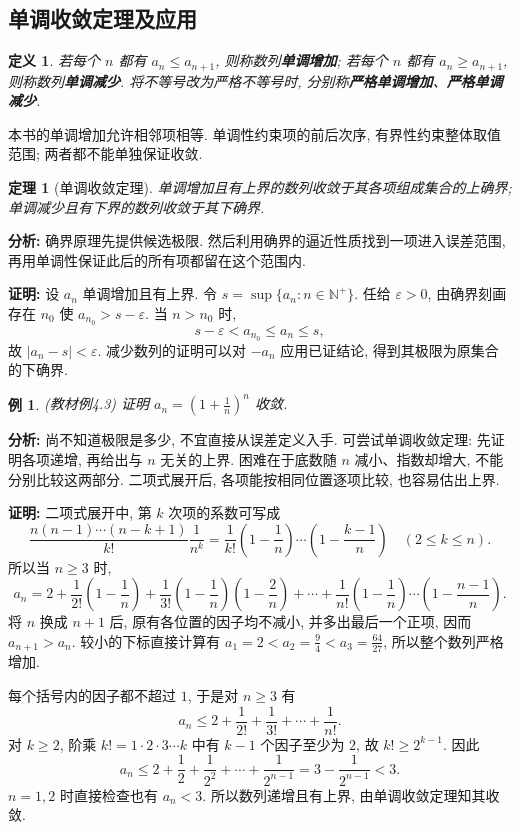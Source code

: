 \documentclass[UTF8,openany]{ctexbook}
\theoremstyle{chinesetextbook}
\newtheorem{definition}{定义}[section]
\newtheorem{example}{例}[section]
\newtheorem{theorem}{定理}[section]
\newenvironment{cnproof}{\par\indent\textbf{证明:} \ignorespaces}{\par}
\begin{document}
\subsection{单调收敛定理及应用}
\begin{definition}
若每个 $n$ 都有 $a_n\le a_{n+1}$, 则称数列\textbf{单调增加}; 若每个 $n$ 都有 $a_n\ge a_{n+1}$, 则称数列\textbf{单调减少}. 将不等号改为严格不等号时, 分别称\textbf{严格单调增加}、\textbf{严格单调减少}.
\end{definition}
本书的单调增加允许相邻项相等. 单调性约束项的前后次序, 有界性约束整体取值范围; 两者都不能单独保证收敛.
\begin{theorem}[单调收敛定理]
单调增加且有上界的数列收敛于其各项组成集合的上确界; 单调减少且有下界的数列收敛于其下确界.
\end{theorem}
\par\indent\textbf{分析:} 确界原理先提供候选极限. 然后利用确界的逼近性质找到一项进入误差范围, 再用单调性保证此后的所有项都留在这个范围内.
\begin{cnproof}
设 $a_n$ 单调增加且有上界. 令 $s=\sup\{a_n:n\in\mathbb N^+\}$. 任给 $\varepsilon>0$, 由确界刻画存在 $n_0$ 使 $a_{n_0}>s-\varepsilon$. 当 $n>n_0$ 时,
\[
s-\varepsilon<a_{n_0}\le a_n\le s,
\]
故 $|a_n-s|<\varepsilon$. 减少数列的证明可以对 $-a_n$ 应用已证结论, 得到其极限为原集合的下确界.
\end{cnproof}
\begin{example}
(教材例4.3) 证明 $\displaystyle a_n=\left(1+\frac1n\right)^n$ 收敛.
\end{example}
\par\indent\textbf{分析:} 尚不知道极限是多少, 不宜直接从误差定义入手. 可尝试单调收敛定理: 先证明各项递增, 再给出与 $n$ 无关的上界. 困难在于底数随 $n$ 减小、指数却增大, 不能分别比较这两部分. 二项式展开后, 各项能按相同位置逐项比较, 也容易估出上界.
\begin{cnproof}
二项式展开中, 第 $k$ 次项的系数可写成
\[
\frac{n(n-1)\cdots(n-k+1)}{k!}\frac1{n^k}
=\frac1{k!}\left(1-\frac1n\right)\cdots\left(1-\frac{k-1}{n}\right)
\quad(2\le k\le n).
\]
所以当 $n\ge3$ 时,
\[
a_n=2+\frac1{2!}\left(1-\frac1n\right)
+\frac1{3!}\left(1-\frac1n\right)\left(1-\frac2n\right)
+\cdots+\frac1{n!}\left(1-\frac1n\right)\cdots\left(1-\frac{n-1}{n}\right).
\]
将 $n$ 换成 $n+1$ 后, 原有各位置的因子均不减小, 并多出最后一个正项, 因而 $a_{n+1}>a_n$. 较小的下标直接计算有 $\displaystyle a_1=2<a_2=\frac94<a_3=\frac{64}{27}$, 所以整个数列严格增加.

每个括号内的因子都不超过 $1$, 于是对 $n\ge3$ 有
\[
a_n\le2+\frac1{2!}+\frac1{3!}+\cdots+\frac1{n!}.
\]
对 $k\ge2$, 阶乘 $k!=1\cdot2\cdot3\cdots k$ 中有 $k-1$ 个因子至少为 $2$, 故 $k!\ge2^{k-1}$. 因此
\[
a_n\le2+\frac12+\frac1{2^2}+\cdots+\frac1{2^{n-1}}
=3-\frac1{2^{n-1}}<3.
\]
$n=1,2$ 时直接检查也有 $a_n<3$. 所以数列递增且有上界, 由单调收敛定理知其收敛.
\end{cnproof}
\end{document}
